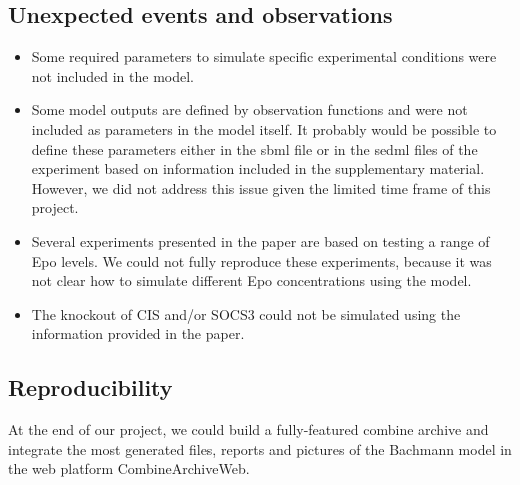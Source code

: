 \subsection*{Unexpected events and observations}
\begin{itemize}
    \item Some required parameters to simulate specific experimental conditions were not included in the model.
\item Some model outputs are defined by observation functions and were not included as parameters in the model itself. It probably would be possible to define these parameters either in the \ac{sbml} file or in the \ac{sedml} files of the experiment based on information included in the supplementary material. However, we did not address this issue given the limited time frame of this project.
\item Several experiments presented in the paper are based on testing a range of Epo levels. We could not fully reproduce these experiments, because it was not clear how to simulate different Epo concentrations using the model.
\item The knockout of CIS and/or SOCS3 could not be simulated using the information provided in the paper.
\end{itemize}

\subsection*{Reproducibility}
At the end of our project, we could build a fully-featured \ac{combine} archive and integrate the most generated files, reports and pictures of the Bachmann model in the web platform CombineArchiveWeb.